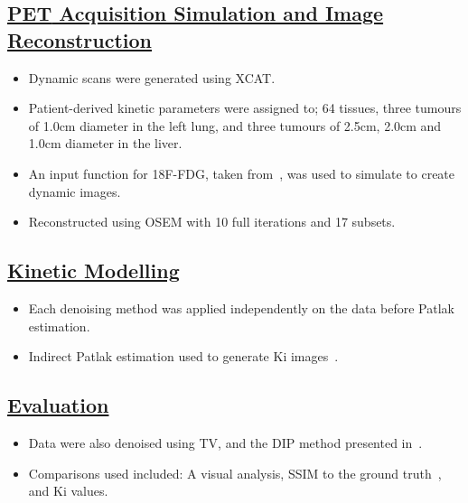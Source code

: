 \documentclass[portrait, color=UCLburgundy, margin=1cm]{uclposter}
\begin{document}
\begin{multicols}{2}
            \subsection*{\underline{\textbf{\acrshort{PET} Acquisition Simulation and Image Reconstruction}}}
                \begin{itemize}
                    \item Dynamic scans were generated using \acrshort{XCAT}.
                    \item Patient-derived kinetic parameters were assigned to; 64 tissues, three tumours of 1.0cm diameter in the left lung, and three tumours of 2.5cm, 2.0cm and 1.0cm diameter in the liver.
                    \item An input function for \acrshort{18F-FDG}, taken from~\cite{langsjoEffectsSubanestheticKetamine2004}, was used to simulate  to create dynamic images.
                    \item Reconstructed using \gls{OSEM} with 10 full iterations and 17 subsets.
                \end{itemize}
            
            \subsection*{\underline{\textbf{Kinetic Modelling}}}
                \begin{itemize}
                    \item Each denoising method was applied independently on the data before Patlak estimation.
                    \item Indirect Patlak estimation used to generate Ki images~\cite{patlak1983GraphicalEvaluationBloodtoBrain}.
                \end{itemize}
            
            \subsection*{\underline{\textbf{Evaluation}}}
                \begin{itemize}
                    \item Data were also denoised using \gls{TV}, and the \gls{DIP} method presented in~\cite{Gong2019PETPrior}.
                    \item Comparisons used included: A visual analysis, \gls{SSIM} to the ground truth~\cite{Wang2009MeanMeasures}, and Ki values.
                \end{itemize}
        

\end{multicols}
\end{document}
